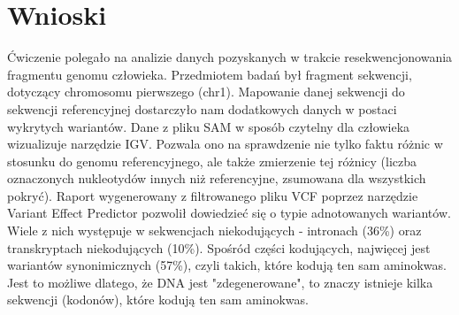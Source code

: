 \documentclass[a4paper]{article}
\begin{document}
\section{Wnioski}
Ćwiczenie polegało na analizie danych pozyskanych w trakcie resekwencjonowania fragmentu genomu człowieka. Przedmiotem badań był fragment sekwencji, dotyczący chromosomu pierwszego (chr1). Mapowanie danej sekwencji do sekwencji referencyjnej dostarczyło nam dodatkowych danych w postaci wykrytych wariantów. Dane z pliku SAM w sposób czytelny dla człowieka wizualizuje narzędzie IGV. Pozwala ono na sprawdzenie nie tylko faktu różnic w stosunku do genomu referencyjnego, ale także zmierzenie tej różnicy (liczba oznaczonych nukleotydów innych niż referencyjne, zsumowana dla wszystkich pokryć). Raport wygenerowany z filtrowanego pliku VCF poprzez narzędzie Variant Effect Predictor pozwolił dowiedzieć się o typie adnotowanych wariantów. Wiele z nich występuje w sekwencjach niekodujących - intronach (36\%) oraz transkryptach niekodujących (10\%). Spośród części kodujących, najwięcej jest wariantów synonimicznych (57\%), czyli takich, które kodują ten sam aminokwas. Jest to możliwe dlatego, że DNA jest "zdegenerowane", to znaczy istnieje kilka sekwencji (kodonów), które kodują ten sam aminokwas.
\end{document}
